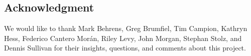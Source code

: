 
\subsection*{Acknowledgment}

We would like to thank Mark Behrens, Greg Brumfiel, Tim Campion, Kathryn Hess, Federico Cantero Mor\'an, Riley Levy, John Morgan, Stephan Stolz, and Dennis Sullivan
for their insights, questions, and comments about this project.